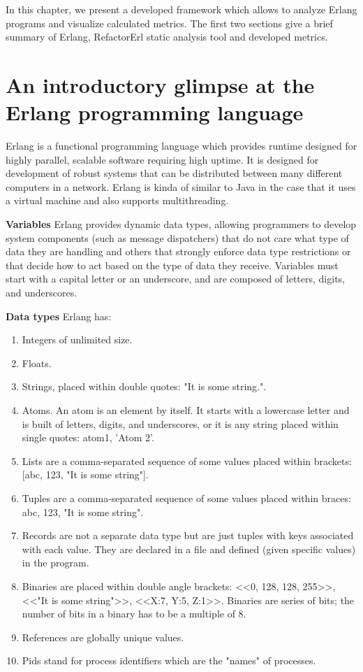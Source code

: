 In this chapter, we present a developed framework which allows to analyze Erlang programs and visualize calculated metrics. The first two sections give a brief summary of Erlang, RefactorErl static analysis tool and developed metrics.

\section{An introductory glimpse at the Erlang programming language}
Erlang is a functional programming language which provides runtime designed for highly parallel, scalable software requiring high uptime. It is designed for development of robust systems that can be distributed between many different computers in a network. Erlang is kinda of similar to Java in the case that it uses a virtual machine and also supports multithreading. 

\textbf{Variables}
Erlang provides dynamic data types, allowing programmers to develop system
components (such as message dispatchers) that do not care what type of data they are handling and others that strongly enforce data type restrictions or that decide how to act based on the type of data they receive. Variables must start with a capital letter or an underscore, and are composed of letters, digits,	 and underscores.

\textbf{Data types}
Erlang has:
\begin{enumerate}
	\item Integers of unlimited size.
	\item Floats.
	\item Strings, placed within double quotes: "It is some string.".
	\item Atoms. An atom is an element by itself. It starts with a lowercase letter and is built of letters, digits, and underscores, or it is any string placed within single quotes: atom1, 'Atom 2'.
	\item Lists are a comma-separated sequence of some values placed within brackets: [abc, 123, "It is some string"]. 
	\item Tuples are a comma-separated sequence of some values placed within braces: {abc, 123, "It is some string"}.
	\item Records are not a separate data type but are just tuples with keys associated with each value. They are declared in a file and defined (given specific values) in the program.
	\item Binaries are placed within double angle brackets: <<0, 128, 128, 255>>, <<"It is some string">>, <<X:7, Y:5, Z:1>>. Binaries are series of bits; the number of bits in a binary has to be a multiple of 8.
	\item References are globally unique values.
	\item Pids stand for process identifiers which are the "names" of processes.
\end{enumerate}

